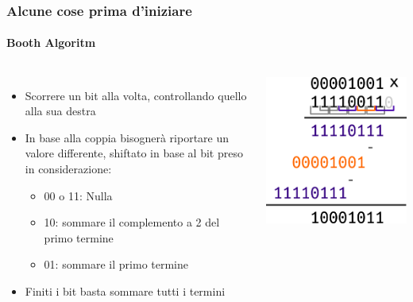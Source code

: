 \documentclass{beamer}
\begin{document}
	\begin{frame}
    \frametitle{Alcune cose prima d'iniziare}
    \framesubtitle{Booth Algoritm}
		\begin{columns}
			\begin{itemize}
				\item Scorrere un bit alla volta, controllando quello alla sua destra
				\item In base alla coppia bisognerà riportare un valore differente, shiftato in
					base al bit preso in considerazione:
				\begin{itemize}
					\item 00 o 11: Nulla
					\item 10: sommare il complemento a 2 del primo termine
					\item 01: sommare il primo termine
				\end{itemize}
				\item Finiti i bit basta sommare tutti i termini
			\end{itemize}
			\begin{center}
	    		\includegraphics[width=.9\textwidth]{IMGs/FastBooth.png}
	    \end{center}
	  \end{columns}
	\end{frame}   
\end{document}
